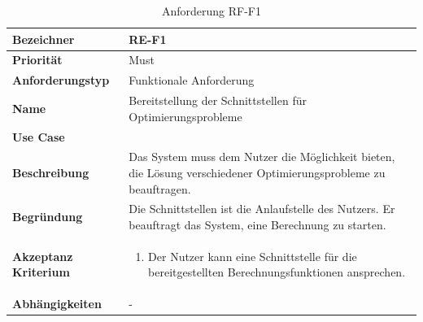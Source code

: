 \begin{table}[ht]
\centering
  \begin{tabular}{ l | p{8cm} }
	\hline
	\rowcolor{gray}
	\textbf{Bezeichner}&	\textbf{RE-F1}\\ \hline
	\textbf{Priorität} 		&	Must\\ \hline
	\textbf{Anforderungstyp}	&	Funktionale Anforderung\\ \hline
	\textbf{Name} 			&	Bereitstellung der Schnittstellen für Optimierungsprobleme\\ \hline
	\textbf{Use Case} 		&	\nameref{table:use_case_1}\\ \hline
	\textbf{Beschreibung} 	&	Das System muss dem Nutzer die Möglichkeit bieten, die Lösung verschiedener Optimierungsprobleme zu beauftragen.\\ \hline
	\textbf{Begründung} 		&	Die Schnittstellen ist die Anlaufstelle des Nutzers. Er beauftragt das System, eine Berechnung zu starten.\\ \hline
	\textbf{Akzeptanz Kriterium}	&	\begin{enumerate}
					\item Der Nutzer kann eine Schnittstelle für die bereitgestellten Berechnungsfunktionen ansprechen.
					\end{enumerate}
					\\ \hline
	\textbf{Abhängigkeiten} 	&	-\\ \hline
  \end{tabular}
   \caption{Anforderung RF-F1}\label{table:req_1}
\end{table}

